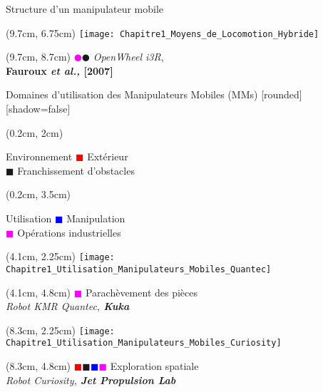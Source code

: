 \documentclass[french]{beamer}
\begin{document}
\begin{frame}{Structure d'un manipulateur mobile}
\begin{textblock*}{3cm}(9.7cm, 6.75cm)
\texttt{[image: Chapitre1\_Moyens\_de\_Locomotion\_Hybride]}
\end{textblock*}
\begin{textblock*}{3cm}(9.7cm, 8.7cm)
\centering
\tiny{\textcolor{magenta}{$\CIRCLE$}\textcolor{vert}{$\CIRCLE$}  \textit{OpenWheel i3R},\\ \textbf{Fauroux \textit{et al.,} [2007]}}\\
\end{textblock*}

\end{frame}
\begin{frame}{Domaines d'utilisation des Manipulateurs Mobiles (MMs)}
[rounded][shadow=false]
{\scriptsize 
\begin{textblock*}{3.7cm}(0.2cm, 2cm) %
\begin{block}{Environnement}
\textcolor{red}{$\blacksquare$} Extérieur\\
\textcolor{vert}{$\blacksquare$} Franchissement d'obstacles\\
\end{block}
\end{textblock*}
 
\begin{textblock*}{3.7cm}(0.2cm, 3.5cm) %
  \begin{block}{Utilisation}
\textcolor{blue}{$\blacksquare$} Manipulation\\
\textcolor{magenta}{$\blacksquare$} Opérations industrielles
 \end{block}
\end{textblock*}
}

\begin{textblock*}{4.1cm}(4.1cm, 2.25cm)
\texttt{[image: Chapitre1\_Utilisation\_Manipulateurs\_Mobiles\_Quantec]}
\end{textblock*}
\begin{textblock*}{4.1cm}(4.1cm, 4.8cm)
\centering
\tiny{\textcolor{magenta}{$\blacksquare$} Parachèvement des pièces}\\
\tiny{\textit{Robot KMR Quantec, \textbf{Kuka}}}\\
\end{textblock*}

\begin{textblock*}{4.1cm}(8.3cm, 2.25cm)
\texttt{[image: Chapitre1\_Utilisation\_Manipulateurs\_Mobiles\_Curiosity]}
\end{textblock*}
\begin{textblock*}{4.1cm}(8.3cm, 4.8cm)
\centering
\tiny{\textcolor{red}{$\blacksquare$}\textcolor{vert}{$\blacksquare$}\textcolor{blue}{$\blacksquare$}\textcolor{magenta}{$\blacksquare$} Exploration spatiale}\\
\tiny{\textit{Robot Curiosity, \textbf{Jet Propulsion Lab}}}\\
\end{textblock*}


\end{frame}
\end{document}
